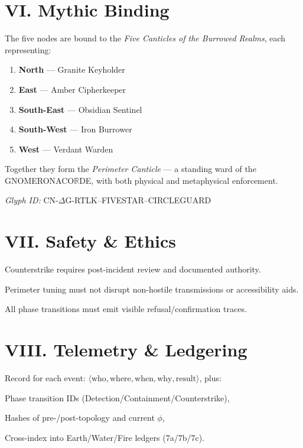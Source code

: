 \section*{VI. Mythic Binding}
The five nodes are bound to the \emph{Five Canticles of the Burrowed Realms}, each representing:
\begin{enumerate}
    \item \textbf{North} --- Granite Keyholder
    \item \textbf{East} --- Amber Cipherkeeper
    \item \textbf{South-East} --- Obsidian Sentinel
    \item \textbf{South-West} --- Iron Burrower
    \item \textbf{West} --- Verdant Warden
\end{enumerate}
Together they form the \emph{Perimeter Canticle} — a standing ward of the GNOMERONACO$\mathbb{R}$DE\texttrademark, with both physical and metaphysical enforcement.

\bigskip
\noindent\emph{Glyph ID:} CN-$\Delta$G-RTLK--FIVESTAR--CIRCLEGUARD

\section*{VII. Safety \& Ethics}
\begin{tightitemize}
  \item Counterstrike requires post-incident review and documented authority.
  \item Perimeter tuning must not disrupt non-hostile transmissions or accessibility aids.
  \item All phase transitions must emit visible refusal/confirmation traces.
\end{tightitemize}

\section*{VIII. Telemetry \& Ledgering}
Record for each event: \(\langle \text{who}, \text{where}, \text{when}, \text{why}, \text{result} \rangle\), plus:
\begin{tightitemize}
  \item Phase transition IDs (Detection/Containment/Counterstrike),
  \item Hashes of pre-/post-topology and current \(\phi\),
  \item Cross-index into Earth/Water/Fire ledgers (7a/7b/7c).
\end{tightitemize}

